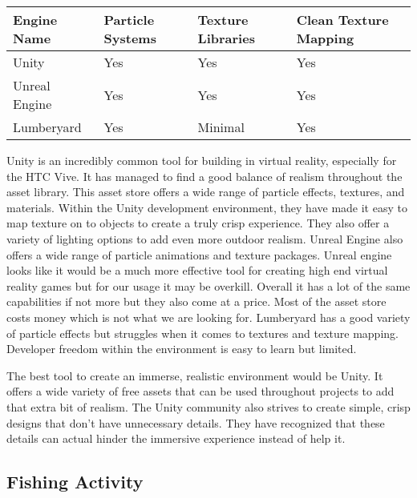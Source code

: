 \documentclass[10pt,journal,compsoc,onecolumn, draftclsnofoot]{IEEEtran}
\begin{document}
\begin{bibunit}
\vspace{2mm}
\begin{table}[h!]
\centering
  \begin{tabu} to 1.0\textwidth { | X[l] || X[c] | X[c] | X[c] |  }
  \hline
  Engine Name & Particle Systems & Texture Libraries & Clean Texture Mapping\\
  \hline
  Unity  & Yes & Yes & Yes\\
  Unreal Engine & Yes & Yes & Yes\\
  Lumberyard & Yes & Minimal & Yes \\
  \hline
  \end{tabu}
\end{table}
\vspace{2mm}

Unity is an incredibly common tool for building in virtual reality, especially for the HTC Vive.
It has managed to find a good balance of realism throughout the asset library\cite{unity_store_age}.
This asset store offers a wide range of particle effects, textures, and materials.
Within the Unity development environment, they have made it easy to map texture on to objects to create a truly crisp experience.
They also offer a variety of lighting options to add even more outdoor realism.
Unreal Engine also offers a wide range of particle animations and texture packages\cite{unreal_editor_manual}.
Unreal engine looks like it would be a much more effective tool for creating high end virtual reality games but for our usage it may be overkill.
Overall it has a lot of the same capabilities if not more but they also come at a price.
Most of the asset store costs money which is not what we are looking for.
Lumberyard has a good variety of particle effects but struggles when it comes to textures and texture mapping\cite{lumberyard_levels_environment}.
Developer freedom within the environment is easy to learn but limited.

The best tool to create an immerse, realistic environment would be Unity.
It offers a wide variety of free assets that can be used throughout projects to add that extra bit of realism.
The Unity community also strives to create simple, crisp designs that don’t have unnecessary details.
They have recognized that these details can actual hinder the immersive experience instead of help it.
\vspace{2mm
}

\subsection{Fishing Activity}

\end{bibunit}
\end{document}
